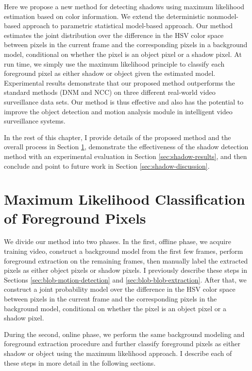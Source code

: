 Here we propose a new method for detecting shadows using maximum
likelihood estimation based on color information.  We extend the
deterministic nonmodel-based approach to parametric statistical
model-based approach. Our method estimates the joint distribution over
the difference in the HSV color space between pixels in the current
frame and the corresponding pixels in a background model, conditional
on whether the pixel is an object pixel or a shadow pixel. At run
time, we simply use the maximum likelihood principle to classify each
foreground pixel as either shadow or object given the estimated model.
Experimental results demonstrate that our proposed method outperforms
the standard methods (DNM and NCC) on three different real-world video
surveillance data sets. Our method is thus effective and also has the
potential to improve the object detection and motion analysis module
in intelligent video surveillance systems.

In the rest of this chapter, I provide details of the proposed method
and the overall process in Section \ref{sec:shadow-algorithm},
demonstrate the effectiveness of the shadow detection method with an
experimental evaluation in Section \ref{sec:shadow-results}, and then
conclude and point to future work in
Section \ref{sec:shadow-discussion}.

\section{Maximum Likelihood Classification of Foreground Pixels}
\label{sec:shadow-algorithm}

We divide our method into two phases.  In the first, offline phase, we
acquire training video, construct a background model from the first
few frames, perform foreground extraction on the remaining frames,
then manually label the extracted pixels as either object pixels or
shadow pixels.  I previously describe these steps in
Sections \ref{sec:blob-motion-detection}
and \ref{sec:blob-blob-extraction}. After that, we construct a joint
probability model over the difference in the HSV color space between
pixels in the current frame and the corresponding pixels in the
background model, conditional on whether the pixel is an object pixel
or a shadow pixel.

During the second, online phase, we perform the same background
modeling and foreground extraction procedure and further classify
foreground pixels as either shadow or object using the maximum
likelihood approach. I describe each of these steps in more detail in
the following sections.

